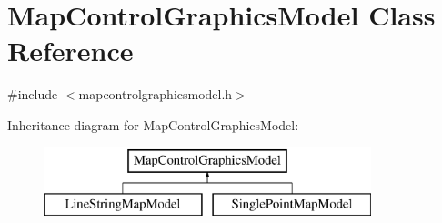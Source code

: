\hypertarget{class_map_control_graphics_model}{}\section{Map\+Control\+Graphics\+Model Class Reference}
\label{class_map_control_graphics_model}


{\ttfamily \#include $<$mapcontrolgraphicsmodel.\+h$>$}

Inheritance diagram for Map\+Control\+Graphics\+Model\+:\begin{figure}[H]
\begin{center}
\leavevmode
\includegraphics[height=2.000000cm]{d4/db7/class_map_control_graphics_model}
\end{center}
\end{figure}
